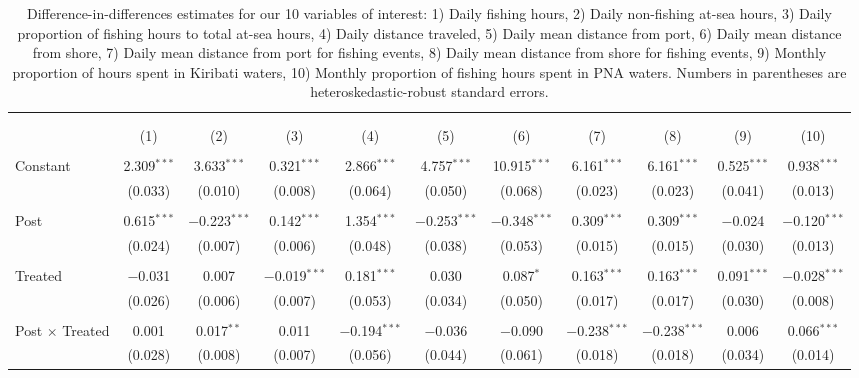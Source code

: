 
\begin{table}[!htbp] \centering 
  \caption{\label{tab:main_DID}Difference-in-differences estimates for our 10 variables of interest: 1) Daily fishing hours, 2) Daily non-fishing at-sea hours, 3) Daily proportion of fishing hours to total at-sea hours, 4) Daily distance traveled, 5) Daily mean distance from port, 6) Daily mean distance from shore, 7) Daily mean distance from port for fishing events, 8) Daily mean distance from shore for fishing events, 9) Monthly proportion of hours spent in Kiribati waters, 10) Monthly proportion of fishing hours spent in PNA waters. Numbers in parentheses are heteroskedastic-robust standard errors.} 
  \label{} 
\footnotesize 
\begin{tabular}{@{\extracolsep{1pt}}lcccccccccc} 
\\[-1.8ex]\hline 
\hline \\[-1.8ex] 
\\[-1.8ex] & (1) & (2) & (3) & (4) & (5) & (6) & (7) & (8) & (9) & (10)\\ 
\hline \\[-1.8ex] 
 Constant & 2.309$^{***}$ & 3.633$^{***}$ & 0.321$^{***}$ & 2.866$^{***}$ & 4.757$^{***}$ & 10.915$^{***}$ & 6.161$^{***}$ & 6.161$^{***}$ & 0.525$^{***}$ & 0.938$^{***}$ \\ 
  & (0.033) & (0.010) & (0.008) & (0.064) & (0.050) & (0.068) & (0.023) & (0.023) & (0.041) & (0.013) \\ 
  & & & & & & & & & & \\ 
 Post & 0.615$^{***}$ & $-$0.223$^{***}$ & 0.142$^{***}$ & 1.354$^{***}$ & $-$0.253$^{***}$ & $-$0.348$^{***}$ & 0.309$^{***}$ & 0.309$^{***}$ & $-$0.024 & $-$0.120$^{***}$ \\ 
  & (0.024) & (0.007) & (0.006) & (0.048) & (0.038) & (0.053) & (0.015) & (0.015) & (0.030) & (0.013) \\ 
  & & & & & & & & & & \\ 
 Treated & $-$0.031 & 0.007 & $-$0.019$^{***}$ & 0.181$^{***}$ & 0.030 & 0.087$^{*}$ & 0.163$^{***}$ & 0.163$^{***}$ & 0.091$^{***}$ & $-$0.028$^{***}$ \\ 
  & (0.026) & (0.006) & (0.007) & (0.053) & (0.034) & (0.050) & (0.017) & (0.017) & (0.030) & (0.008) \\ 
  & & & & & & & & & & \\ 
 Post $\times$ Treated & 0.001 & 0.017$^{**}$ & 0.011 & $-$0.194$^{***}$ & $-$0.036 & $-$0.090 & $-$0.238$^{***}$ & $-$0.238$^{***}$ & 0.006 & 0.066$^{***}$ \\ 
  & (0.028) & (0.008) & (0.007) & (0.056) & (0.044) & (0.061) & (0.018) & (0.018) & (0.034) & (0.014) \\ 

\end{tabular}
\end{table}
